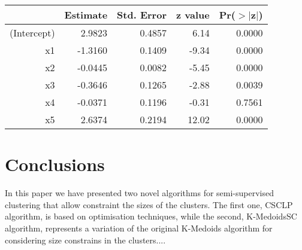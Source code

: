 \documentclass[procedia]{easychair}
\begin{document}
\begin{table}[ht]
\centering
\begin{tabular}{rrrrr}
  \hline
 & Estimate & Std. Error & z value & Pr($>|$z$|$) \\ 
  \hline
(Intercept) & 2.9823 & 0.4857 & 6.14 & 0.0000 \\ 
  x1 & -1.3160 & 0.1409 & -9.34 & 0.0000 \\ 
  x2 & -0.0445 & 0.0082 & -5.45 & 0.0000 \\ 
  x3 & -0.3646 & 0.1265 & -2.88 & 0.0039 \\ 
  x4 & -0.0371 & 0.1196 & -0.31 & 0.7561 \\ 
  x5 & 2.6374 & 0.2194 & 12.02 & 0.0000 \\ 
   \hline
\end{tabular}
\end{table}



\section{Conclusions}
\label{sect:conclusions}

In this paper we have presented two novel algorithms for semi-supervised clustering that allow constraint the sizes of the clusters. The first one, CSCLP algorithm, is based on optimisation techniques, while the second, K-MedoidsSC algorithm, represents a variation of the original K-Medoids algorithm for considering size constrains in the clusters....

\label{sect:bib}

%
%
%




\end{document}
